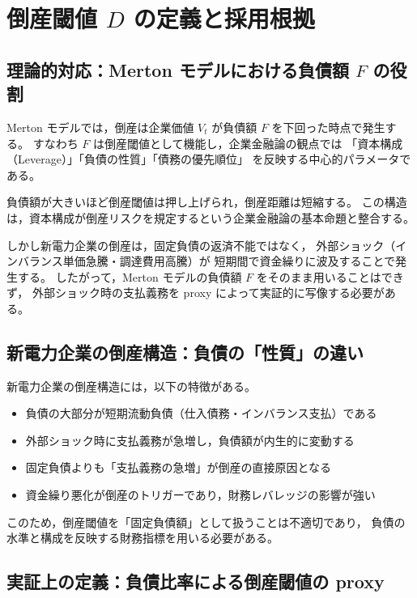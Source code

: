 \section{倒産閾値 $D$ の定義と採用根拠}

\subsection{理論的対応：Merton モデルにおける負債額 $F$ の役割}

Merton モデルでは，倒産は企業価値 $V_t$ が負債額 $F$ を下回った時点で発生する。
すなわち $F$ は倒産閾値として機能し，企業金融論の観点では
「資本構成（Leverage）」「負債の性質」「債務の優先順位」
を反映する中心的パラメータである。

負債額が大きいほど倒産閾値は押し上げられ，倒産距離は短縮する。
この構造は，資本構成が倒産リスクを規定するという企業金融論の基本命題と整合する。

しかし新電力企業の倒産は，固定負債の返済不能ではなく，
外部ショック（インバランス単価急騰・調達費用高騰）が
短期間で資金繰りに波及することで発生する。
したがって，Merton モデルの負債額 $F$ をそのまま用いることはできず，
外部ショック時の支払義務を proxy によって実証的に写像する必要がある。

\subsection{新電力企業の倒産構造：負債の「性質」の違い}

新電力企業の倒産構造には，以下の特徴がある。

\begin{itemize}
    \item 負債の大部分が短期流動負債（仕入債務・インバランス支払）である
    \item 外部ショック時に支払義務が急増し，負債額が内生的に変動する
    \item 固定負債よりも「支払義務の急増」が倒産の直接原因となる
    \item 資金繰り悪化が倒産のトリガーであり，財務レバレッジの影響が強い
\end{itemize}

このため，倒産閾値を「固定負債額」として扱うことは不適切であり，
負債の水準と構成を反映する財務指標を用いる必要がある。

\subsection{実証上の定義：負債比率による倒産閾値の proxy}

